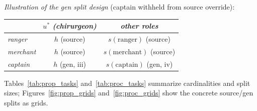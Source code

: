 \documentclass[11pt]{article}
\begin{document}
\smallskip
\noindent\textit{Illustration of the gen split design} (captain withheld from source override):
\begin{center}\footnotesize
\begin{tabular}{l|cc}
 & $u^*$ \textit{(chirurgeon)} & \textit{other roles} \\\hline
\textit{ranger}   & $h$ \textnormal{(source)} & $s(\text{ranger})$ \textnormal{(source)} \\
\textit{merchant} & $h$ \textnormal{(source)} & $s(\text{merchant})$ \textnormal{(source)} \\
\textit{captain}  & $h$ \textnormal{(gen, iii)} & $s(\text{captain})$ \textnormal{(gen, iv)} \\
\end{tabular}
\end{center}

Tables~\ref{tab:prop_tasks} and~\ref{tab:proc_tasks} summarize
cardinalities and split sizes; Figures~\ref{fig:prop_grids}
and~\ref{fig:proc_grids} show the concrete source/gen splits as grids.

\end{document}

